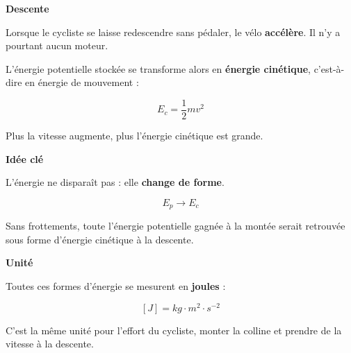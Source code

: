 \documentclass[11pt,a4paper]{article}
\begin{document}
{\textbf{Descente}

\vspace{0.2cm}

Lorsque le cycliste se laisse redescendre sans pédaler, le vélo \textbf{accélère}.
Il n’y a pourtant aucun moteur.

L’énergie potentielle stockée se transforme alors en \textbf{énergie cinétique},
c’est-à-dire en énergie de mouvement :

\[
E_c = \frac{1}{2} m v^2
\]

Plus la vitesse augmente, plus l’énergie cinétique est grande.

\vspace{0.3cm}

\textbf{Idée clé}

\vspace{0.1cm}

L’énergie ne disparaît pas :  
elle \textbf{change de forme}.

\[
E_p \longrightarrow E_c
\]

Sans frottements, toute l’énergie potentielle gagnée à la montée
serait retrouvée sous forme d’énergie cinétique à la descente.

\vspace{0.3cm}

\textbf{Unité}

\vspace{0.1cm}

Toutes ces formes d’énergie se mesurent en \textbf{joules} :

\[
[J] = kg \cdot m^2 \cdot s^{-2}
\]

C’est la même unité pour l’effort du cycliste, monter la colline
et prendre de la vitesse à la descente.

}
\end{document}
